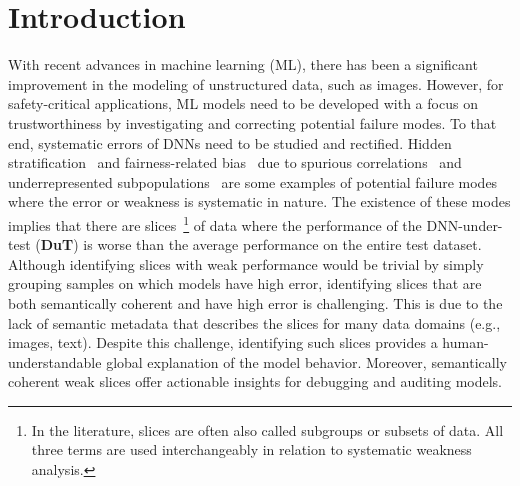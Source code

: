 \section{Introduction}
\label{sec:intro}







With recent advances in machine learning (ML), there has been a significant improvement in the modeling of unstructured data, such as images. 
However, for safety-critical applications, ML models need to be developed with a focus on trustworthiness by investigating and correcting potential failure modes.
To that end, systematic errors of DNNs need to be studied and rectified. Hidden stratification~\citep{oakden2020hidden} and fairness-related bias~\citep{buolamwini2018gender, wang2020towards, li2023dark} due to spurious correlations~\citep{xiao2020noise, geirhos2020shortcut,mahmood2021detecting} and underrepresented subpopulations~\citep{santurkar2020breeds,sagawa2019distributionally} are some examples of potential failure modes where the error or weakness is systematic in nature. The existence of these modes implies that there are slices~\footnote{In the literature, slices are often also called subgroups or subsets of data. All three terms are used interchangeably in relation to systematic weakness analysis.} of data where the performance of the DNN-under-test (\textbf{DuT}) is worse than the average performance on the entire test dataset. Although identifying slices with weak performance would be trivial by simply grouping samples on which models have high error, identifying slices that are both semantically coherent and have high error is challenging. This is due to the lack of semantic metadata that describes the slices for many data domains (e.g., images, text). Despite this challenge, identifying such slices provides a human-understandable global explanation of the model behavior. Moreover, semantically coherent weak slices offer actionable insights for debugging and auditing models. 


